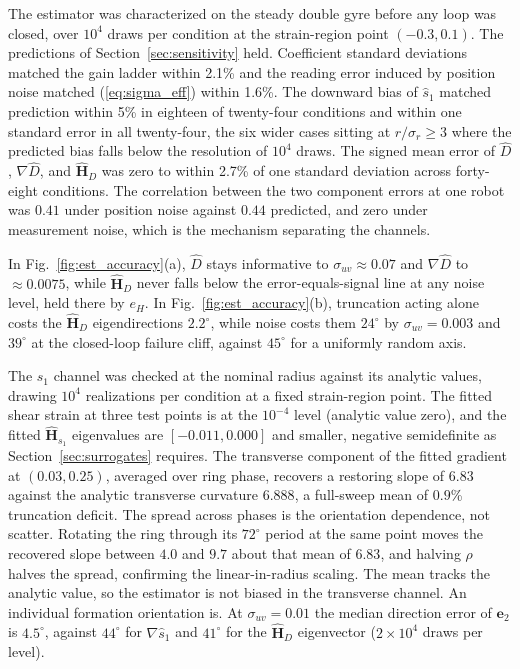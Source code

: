 \documentclass[lettersize,journal]{IEEEtran}
\begin{document}
The estimator was characterized on the steady double gyre before any loop
was closed, over $10^4$ draws per condition at the strain-region point
$(-0.3, 0.1)$. The predictions of Section~\ref{sec:sensitivity} held.
Coefficient standard deviations matched the gain ladder
within 2.1\% and the reading error induced by
position noise matched (\ref{eq:sigma_eff}) within 1.6\%. The downward
bias of $\hat{s}_1$ matched prediction within 5\% in eighteen of
twenty-four conditions and within one standard error in all
twenty-four, the six wider cases sitting at $r/\sigma_r \geq
3$ where the predicted bias falls below the resolution of $10^4$
draws. The signed mean error of $\hat{D}$, $\nabla\hat{D}$, and
$\hat{\mathbf{H}}_D$ was zero to within 2.7\% of one standard deviation
across forty-eight conditions.
The correlation between the two component errors at one robot was $0.41$
under position noise against $0.44$ predicted, and zero under measurement
noise, which is the mechanism separating the channels.

In Fig.~\ref{fig:est_accuracy}(a), $\hat{D}$ stays informative to
$\sigma_{uv} \approx 0.07$ and $\nabla\hat{D}$ to $\approx 0.0075$, while
$\hat{\mathbf{H}}_D$ never falls below the error-equals-signal line at any
noise level, held there by $e_H$. In Fig.~\ref{fig:est_accuracy}(b),
truncation acting alone costs the $\hat{\mathbf{H}}_D$ eigendirections
$2.2^\circ$, while noise costs them $24^\circ$ by $\sigma_{uv} = 0.003$ and
$39^\circ$ at the closed-loop failure cliff, against $45^\circ$ for a
uniformly random axis.

The $s_1$ channel was checked at the nominal radius against its analytic
values, drawing $10^4$ realizations per condition at a fixed
strain-region point. The fitted shear strain at three test points is at
the $10^{-4}$ level (analytic value zero), and the fitted
$\hat{\mathbf{H}}_{s_1}$ eigenvalues are $[-0.011, 0.000]$ and smaller,
negative semidefinite as Section~\ref{sec:surrogates} requires. The
transverse component of the fitted gradient at $(0.03, 0.25)$, averaged
over ring phase, recovers a restoring slope of $6.83$ against the
analytic transverse curvature $6.888$, a full-sweep mean of $0.9$\%
truncation deficit. The spread across phases is the orientation
dependence, not scatter.
Rotating the ring through its $72^\circ$ period at the same point moves
the recovered slope between $4.0$ and $9.7$ about that mean of $6.83$,
and halving $\rho$ halves the spread, confirming the linear-in-radius
scaling. The mean tracks the analytic value, so the estimator is not
biased in the transverse channel. An individual formation orientation
is. At $\sigma_{uv} = 0.01$ the median direction error of
$\mathbf{e}_2$ is $4.5^\circ$, against $44^\circ$ for $\nabla\hat{s}_1$
and $41^\circ$ for the $\hat{\mathbf{H}}_D$ eigenvector ($2\times 10^4$
draws per level).
\end{document}
